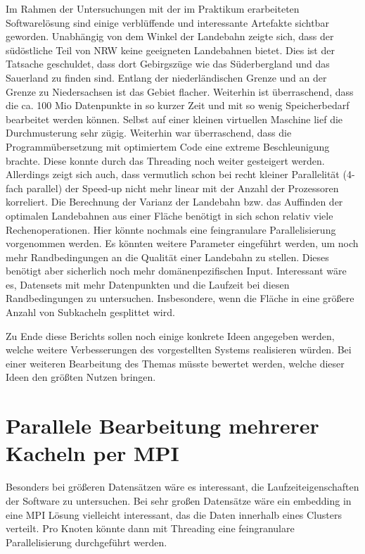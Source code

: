 \documentclass[10pt,a4paper]{report}
\newcommand*{\skippingparagraph}{\par\vspace{1.0\baselineskip}\noindent}
\begin{document}
Im Rahmen der Untersuchungen mit der im Praktikum erarbeiteten Softwarelösung sind einige verblüffende und interessante Artefakte sichtbar geworden.
Unabhängig von dem Winkel der Landebahn zeigte sich, dass der südöstliche Teil von NRW keine geeigneten Landebahnen bietet. Dies ist der Tatsache geschuldet, dass dort Gebirgszüge wie das Süderbergland und das Sauerland zu finden sind.
Entlang der niederländischen Grenze und an der Grenze zu Niedersachsen ist das Gebiet flacher.
Weiterhin ist überraschend, dass die ca. 100 Mio Datenpunkte in so kurzer Zeit und mit so wenig Speicherbedarf bearbeitet werden können. Selbst auf einer kleinen virtuellen Maschine lief die Durchmusterung sehr zügig.
Weiterhin war überraschend, dass die Programmübersetzung mit optimiertem Code eine extreme Beschleunigung brachte.
Diese konnte durch das Threading noch weiter gesteigert werden.
Allerdings zeigt sich auch, dass vermutlich schon bei recht kleiner Parallelität (4-fach parallel) der Speed-up nicht mehr linear mit der Anzahl der Prozessoren korreliert.
Die Berechnung der Varianz der Landebahn bzw. das Auffinden der optimalen Landebahnen aus einer Fläche benötigt in sich schon relativ viele Rechenoperationen. Hier könnte nochmals eine feingranulare Parallelisierung vorgenommen werden.
Es könnten weitere Parameter eingeführt werden, um noch mehr Randbedingungen an die Qualität einer Landebahn zu stellen. Dieses benötigt aber sicherlich noch mehr domänenpezifischen Input.
Interessant wäre es, Datensets mit mehr Datenpunkten und die Laufzeit bei diesen Randbedingungen zu untersuchen. Insbesondere, wenn die Fläche in eine größere Anzahl von Subkacheln gesplittet wird.

\skippingparagraph

Zu Ende diese Berichts sollen noch einige konkrete Ideen angegeben werden, welche weitere Verbesserungen des vorgestellten Systems realisieren würden. Bei einer weiteren Bearbeitung des Themas müsste bewertet werden, welche dieser Ideen den größten Nutzen bringen.
 
\section{Parallele Bearbeitung mehrerer Kacheln per MPI}
Besonders bei größeren Datensätzen wäre es interessant, die Laufzeiteigenschaften der Software zu untersuchen. Bei sehr großen Datensätze wäre ein embedding in eine MPI Lösung vielleicht interessant, das die Daten innerhalb eines Clusters verteilt. Pro Knoten könnte dann mit Threading eine feingranulare Parallelisierung durchgeführt werden. 
\end{document}
